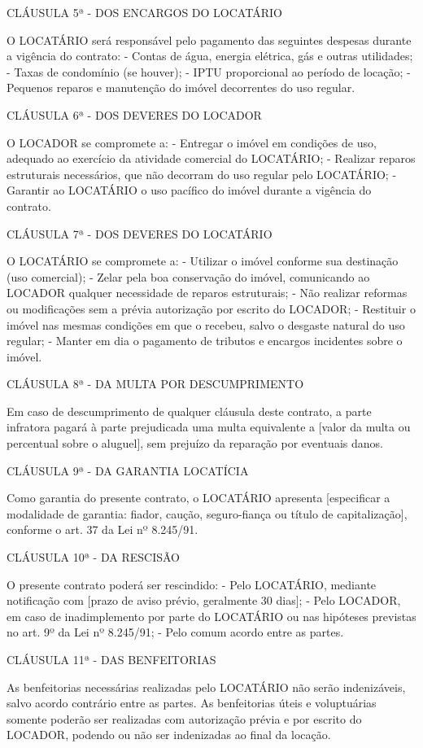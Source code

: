 \begin{anexosenv}
CLÁUSULA 5ª - DOS ENCARGOS DO LOCATÁRIO

O LOCATÁRIO será responsável pelo pagamento das seguintes despesas durante a vigência do contrato:
- Contas de água, energia elétrica, gás e outras utilidades;
- Taxas de condomínio (se houver);
- IPTU proporcional ao período de locação;
- Pequenos reparos e manutenção do imóvel decorrentes do uso regular.

CLÁUSULA 6ª - DOS DEVERES DO LOCADOR

O LOCADOR se compromete a:
- Entregar o imóvel em condições de uso, adequado ao exercício da atividade comercial do LOCATÁRIO;
- Realizar reparos estruturais necessários, que não decorram do uso regular pelo LOCATÁRIO;
- Garantir ao LOCATÁRIO o uso pacífico do imóvel durante a vigência do contrato.

CLÁUSULA 7ª - DOS DEVERES DO LOCATÁRIO

O LOCATÁRIO se compromete a:
- Utilizar o imóvel conforme sua destinação (uso comercial);
- Zelar pela boa conservação do imóvel, comunicando ao LOCADOR qualquer necessidade de reparos estruturais;
- Não realizar reformas ou modificações sem a prévia autorização por escrito do LOCADOR;
- Restituir o imóvel nas mesmas condições em que o recebeu, salvo o desgaste natural do uso regular;
- Manter em dia o pagamento de tributos e encargos incidentes sobre o imóvel.

CLÁUSULA 8ª - DA MULTA POR DESCUMPRIMENTO

Em caso de descumprimento de qualquer cláusula deste contrato, a parte infratora pagará à parte prejudicada uma multa equivalente a [valor da multa ou percentual sobre o aluguel], sem prejuízo da reparação por eventuais danos.


CLÁUSULA 9ª - DA GARANTIA LOCATÍCIA

Como garantia do presente contrato, o LOCATÁRIO apresenta [especificar a modalidade de garantia: fiador, caução, seguro-fiança ou título de capitalização], conforme o art. 37 da Lei nº 8.245/91.

CLÁUSULA 10ª - DA RESCISÃO

O presente contrato poderá ser rescindido:
- Pelo LOCATÁRIO, mediante notificação com [prazo de aviso prévio, geralmente 30 dias];
- Pelo LOCADOR, em caso de inadimplemento por parte do LOCATÁRIO ou nas hipóteses previstas no art. 9º da Lei nº 8.245/91;
- Pelo comum acordo entre as partes.

CLÁUSULA 11ª - DAS BENFEITORIAS

As benfeitorias necessárias realizadas pelo LOCATÁRIO não serão indenizáveis, salvo acordo contrário entre as partes. As benfeitorias úteis e voluptuárias somente poderão ser realizadas com autorização prévia e por escrito do LOCADOR, podendo ou não ser indenizadas ao final da locação.


\end{anexosenv}
